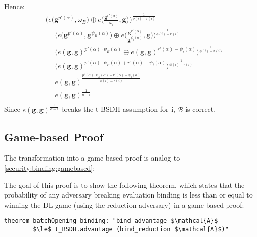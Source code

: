 Hence: 
\begin{equation*}
    \begin{aligned}
        &\biggl(e\biggl(\mathbf{g}^{p'(\alpha)}, \omega_B\biggr) \oplus e\biggl(\frac{\mathbf{g}^{r'(\alpha)}}{\omega_i}, \mathbf{g}\biggr)\biggr)^{\frac{1}{\phi(i)-r(i)}} \\
        &= \biggl(e\biggl(\mathbf{g}^{p'(\alpha)}, \mathbf{g}^{\psi_B(\alpha)}\biggr) \oplus e\biggl(\frac{\mathbf{g}^{r'(\alpha)}}{\mathbf{g}^{\psi_i(\alpha)}}, \mathbf{g}\biggr)\biggr)^{\frac{1}{\phi(i)-r(i)}} \\
        &= \biggl(e(\mathbf{g}, \mathbf{g})^{p'(\alpha) \cdot \psi_B(\alpha)} \oplus e(\mathbf{g}, \mathbf{g})^{r'(\alpha) - \psi_i(\alpha)}\biggr)^{\frac{1}{\phi(i)-r(i)}}\\
        &= \biggl(e(\mathbf{g}, \mathbf{g})^{p'(\alpha) \cdot \psi_B(\alpha) + r'(\alpha) - \psi_i(\alpha)} \biggr)^{\frac{1}{\phi(i)-r(i)}}\\
        &= e(\mathbf{g}, \mathbf{g})^{\frac{p'(\alpha) \cdot \psi_B(\alpha) + r'(\alpha) - \psi_i(\alpha)}{\phi(i)-r(i)}}\\
        &= e(\mathbf{g}, \mathbf{g})^{\frac{1}{\alpha-i}}\\
    \end{aligned}
\end{equation*}
Since $e(\mathbf{g},\mathbf{g})^{\frac{1}{\alpha-i}}$ breaks the t-BSDH assumption for i, $\mathcal{B}$ is correct.

\subsection{Game-based Proof}
The transformation into a game-based proof is analog to \ref{security:binding:gamebased}: 

The goal of this proof is to show the following theorem, which states that the probability of any adversary breaking evaluation binding is less than or equal to winning the DL game (using the reduction adversary) in a game-based proof:
\begin{lstlisting}[language=isabelle]
    theorem batchOpening_binding: "bind_advantage $\mathcal{A}$ 
        $\le$ t_BSDH.advantage (bind_reduction $\mathcal{A}$)"
\end{lstlisting}

